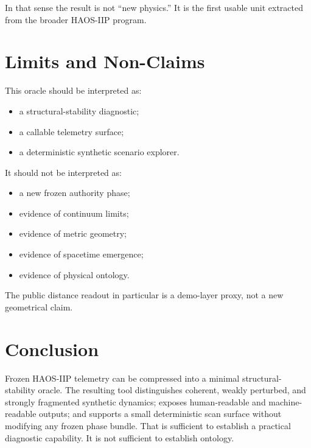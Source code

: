 \documentclass[11pt]{article}
\begin{document}
In that sense the result is not ``new physics.'' It is the first usable unit extracted from the broader HAOS-IIP program.

\section{Limits and Non-Claims}

This oracle should be interpreted as:
\begin{itemize}
\item a structural-stability diagnostic;
\item a callable telemetry surface;
\item a deterministic synthetic scenario explorer.
\end{itemize}

It should not be interpreted as:
\begin{itemize}
\item a new frozen authority phase;
\item evidence of continuum limits;
\item evidence of metric geometry;
\item evidence of spacetime emergence;
\item evidence of physical ontology.
\end{itemize}

The public distance readout in particular is a demo-layer proxy, not a new geometrical claim.

\section{Conclusion}

Frozen HAOS-IIP telemetry can be compressed into a minimal structural-stability oracle. The resulting tool distinguishes coherent, weakly perturbed, and strongly fragmented synthetic dynamics; exposes human-readable and machine-readable outputs; and supports a small deterministic scan surface without modifying any frozen phase bundle. That is sufficient to establish a practical diagnostic capability. It is not sufficient to establish ontology.
\end{document}
